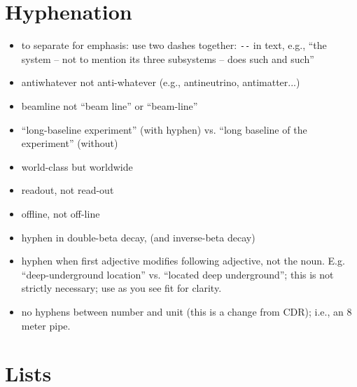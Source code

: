 \section{Hyphenation}
\label{sec:english-hyphen}

\begin{itemize}
\item to separate for emphasis: use two dashes together: \verb|--| in text, e.g.,  ``the system -- not to mention its three subsystems -- does such and such'' 
\item antiwhatever not anti-whatever (e.g., antineutrino, antimatter...)
\item beamline not ``beam line'' or ``beam-line'' 
\item ``long-baseline experiment''  (with hyphen) vs. ``long baseline of the experiment'' (without)
\item world-class but worldwide   
\item readout, not read-out
\item offline, not off-line
\item hyphen in double-beta decay, (and inverse-beta decay)
\item hyphen when first adjective modifies following adjective, not the noun. E.g. ``deep-underground location'' vs. ``located deep underground'';  this is not strictly necessary; use as you see fit for clarity.
\item no hyphens between number and unit (this is a change from CDR); i.e., an 8 meter pipe.
\end{itemize}

\section{Lists}
\label{sec:english-lists}

